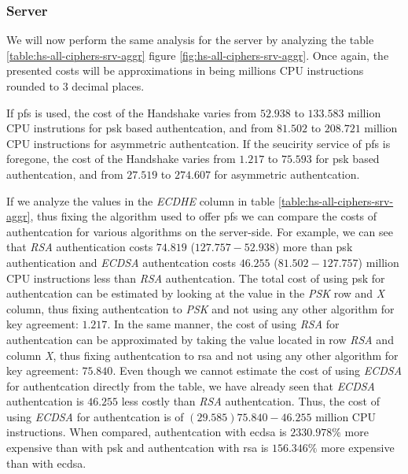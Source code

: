 \documentclass{llncs}
\begin{document}
\subsubsection{Server}

We will now perform the same analysis for the server by analyzing the table \ref{table:hs-all-ciphers-srv-aggr} 
figure \ref{fig:hs-all-ciphers-srv-aggr}. Once again, the presented costs will be approximations in
being millions CPU instructions rounded to $3$ decimal places.

If \gls{pfs} is used, the cost of the Handshake varies from $52.938$ to $133.583$ 
million CPU instrutions for \gls{psk} based authentcation, and from $81.502$ to $208.721$ million CPU instructions for 
asymmetric authentcation. If the seucirity service of \gls{pfs} is foregone, the cost
of the Handshake varies from $1.217$  to $75.593$ for \gls{psk} based authentcation,
and from $27.519$ to $274.607$ for asymmetric authentcation.

If we analyze the values in the \textit{ECDHE} column in table \ref{table:hs-all-ciphers-srv-aggr}, thus fixing the
algorithm used to offer \gls{pfs} we can compare the costs of authentcation for various algorithms on the server-side.
For example, we can see that \textit{RSA} authentication costs $74.819$ ($127.757 - 52.938$) more than \gls{psk} 
authentication and \textit{ECDSA} authentcation costs $46.255$ ($81.502 - 127.757$) million CPU instructions less 
than \textit{RSA} authentcation. The total cost of using \gls{psk} for authentcation can be estimated 
by looking at the
value in the \textit{PSK} row and \textit{X} column, thus fixing authentcation to \textit{PSK} and not using any other
algorithm for key agreement: $1.217$. In the same manner, the cost of using \textit{RSA} for authentcation can
be approximated by taking the value located in row \textit{RSA} and column \textit{X}, thus fixing authentcation
to \gls{rsa} and not using any other algorithm for key agreement: $75.840$. Even though we cannot estimate the cost
of using \textit{ECDSA} for authentcation directly from the table, we have already seen that \textit{ECDSA} authentcation
is $46.255$ less costly than \textit{RSA} authentcation. Thus, the cost of using \textit{ECDSA} for authentcation
is of $(29.585) 75.840-46.255$ million CPU instructions. When compared, authentcation with \gls{ecdsa} is
$2330.978\%$ more expensive than with \gls{psk} and authentcation with \gls{rsa} is $156.346\%$ more expensive 
than with \gls{ecdsa}.
\end{document}
